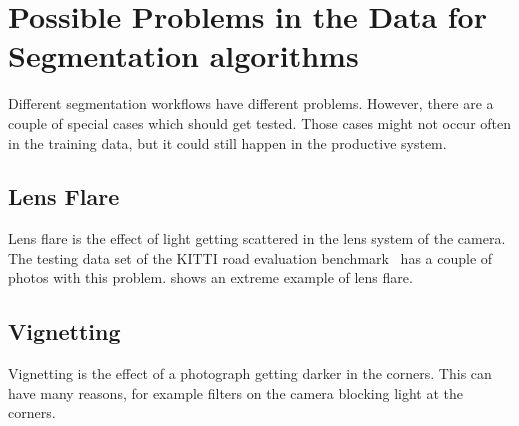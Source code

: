 \section{Possible Problems in the Data for Segmentation algorithms}

Different segmentation workflows have different problems. However, there are
a couple of special cases which should get tested. Those cases might not occur
often in the training data, but it could still happen in the productive system.

\subsection{Lens Flare}
Lens flare is the effect of light getting scattered in the lens system of the
camera. The testing data set of the KITTI road evaluation
benchmark~\cite{Fritsch2013ITSC} has a couple of photos with this problem.
 shows an extreme example of lens flare.


\subsection{Vignetting}
Vignetting is the effect of a photograph getting darker in the corners. This
can have many reasons, for example filters on the camera blocking light at the
corners.


